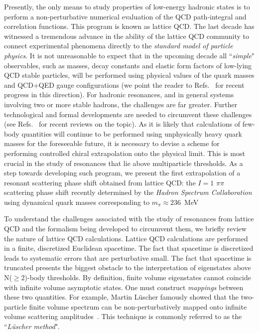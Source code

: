 \documentclass[twocolumn,hyperpdf,
amsmath,amssymb,
aps,prd,10pt,
superscriptaddress,nofootinbib,noeprint,preprintnumbers]{revtex4-1}
\begin{document}
 

Presently, the only means to study properties of low-energy hadronic states is to perform a non-perturbative numerical evaluation of the QCD path-integral and correlation functions. This program is known as lattice QCD. The last decade has witnessed a tremendous advance in the ability of the lattice QCD community to connect experimental phenomena directly to the \emph{standard model of particle physics}. It is not unreasonable to expect that in the upcoming decade all ``\emph{simple}" observables, such as masses, decay constants and elastic form factors of low-lying QCD stable particles, will be performed using physical values of the quark masses and QCD+QED gauge configurations (we point the reader to Refs.~\cite{Borsanyi:2014jba, Borsanyi:2013lga, Aoki:2012st} for recent progress in this direction). For hadronic resonances, and in general systems involving two or more stable hadrons, the challenges are far greater. Further technological and formal developments are needed to circumvent these challenges (see Refs.~\cite{Briceno:2014tqa, Briceno:2014pka, Yamazaki:2015nka, Prelovsek:2014zga} for recent reviews on the topic). As it is likely that calculations of few-body quantities will continue to be performed using unphysically heavy quark masses for the foreseeable future, it is necessary to devise a scheme for performing controlled chiral extrapolation onto the physical limit. This is most crucial in the study of resonances that lie above multiparticle thresholds. As a step towards developing such program, we present the first extrapolation of a resonant scattering phase shift obtained from lattice QCD: the $I=1$ $\pi\pi$ scattering phase shift recently determined by the \emph{Hadron Spectrum Collaboration} using dynamical quark masses corresponding to $m_\pi\approx 236$~MeV~\cite{Wilson:2015dqa}

To understand the challenges associated with the study of resonances from lattice QCD and the formalism being developed to circumvent them, we briefly review the nature of lattice QCD calculations. Lattice QCD calculations are performed in a finite, discretized Euclidean spacetime. The fact that spacetime is discretized leads to systematic errors that are perturbative small. The fact that spacetime is truncated presents the biggest obstacle to the interpretation of eigenstates above N($\geq2$)-body thresholds. By definition, finite volume eigenstates cannot coincide with infinite volume asymptotic states. One must construct \emph{mappings} between these two quantities. For example, Martin L\"uscher famously showed that the two-particle finite volume spectrum can be non-perturbatively mapped onto infinite volume scattering amplitudes~\cite{Luscher:1986pf, Luscher:1990ux}. This technique is commonly referred to as the ``\emph{L\"uscher method}".
\end{document}

